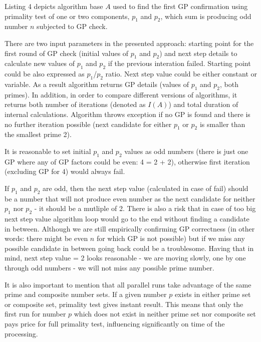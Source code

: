 \documentclass[10pt,twocolumn]{article}
\begin{document}
Listing 4 depicts algorithm base $A$ used to find the first GP confirmation using primality test of one or two components, $p_1$ and $p_2$, which sum is producing odd number $n$ subjected to GP check. \par
There are two input parameters in the presented approach: starting point for the first round of GP check (initial values of $p_1$ and $p_2$) and next step details to calculate new values of $p_1$ and $p_2$ if the previous interation failed. Starting point could be also expressed as $p_1$/$p_2$ ratio. Next step value could be either constant or variable. As a result algorithm returns GP details (values of $p_1$ and $p_2$, both primes). In addition, in order to compare different versions of algorithms, it returns both number of iterations (denoted as $I(A)$) and total duration of internal calculations. Algorithm throws exception if no GP is found and there is no further iteration possible (next candidate for either $p_1$ or $p_2$ is smaller than the smallest prime 2).\par
It is reasonable to set initial $p_1$ and $p_2$ values as odd numbers (there is just one GP where any of GP factors could be even: 4 = 2 + 2), otherwise first iteration (excluding GP for 4) would always fail. \par
If $p_1$ and $p_2$ are odd, then the next step value (calculated in case of fail) should be a number that will not produce even number as the next candidate for neither $p_1$ nor $p_2$ - it should be a mutliple of 2. There is also a risk that in case of too big next step value algorithm loop would go to the end without finding a candidate in between. Although we are still empirically confirming GP correctness (in other words: there might be even $n$ for which GP is not possible) but if we miss any possible candidate in between going back could be a troublesome. Having that in mind, next step value = 2 looks reasonable - we are moving slowly, one by one through odd numbers - we will not miss any possible prime number. \par
It is also important to mention that all parallel runs take advantage of the same prime and composite number sets. If a given number $p$ exists in either prime set or composite set, primality test gives instant result. This means that only the first run for number $p$ which does not exist in neither prime set nor composite set pays price for full primality test, influencing significantly on time of the processing.\par
\end{document}
